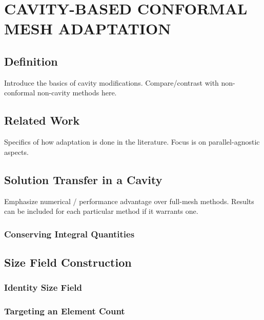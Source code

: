 
\chapter{CAVITY-BASED CONFORMAL MESH ADAPTATION}

\section{Definition}

Introduce the basics of cavity modifications.
Compare/contrast with non-conformal non-cavity methods here.

\section{Related Work}

Specifics of how adaptation is done in the literature.
Focus is on parallel-agnostic aspects.

\section{Solution Transfer in a Cavity}

Emphasize numerical / performance advantage
over full-mesh methods.
Results can be included for each particular
method if it warrants one.

\subsection{Conserving Integral Quantities}

\section{Size Field Construction}

\subsection{Identity Size Field}

\subsection{Targeting an Element Count}

